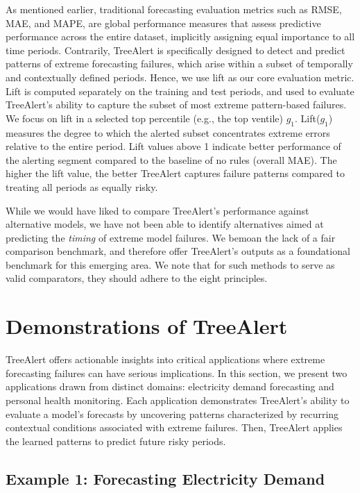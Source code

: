 \documentclass[]{interact}
\theoremstyle{plain}
\theoremstyle{definition}
\theoremstyle{remark}
\begin{document}
As mentioned earlier, traditional forecasting evaluation metrics such as RMSE, MAE, and
MAPE, are global performance measures that assess predictive performance across the entire
dataset, implicitly assigning equal importance to all time periods. Contrarily, TreeAlert is
specifically designed to detect and predict patterns of extreme forecasting failures, which
arise within a subset of temporally and contextually defined periods. Hence, we use lift as
our core evaluation metric. Lift is computed separately on the training and test periods, and
used to evaluate TreeAlert's ability to capture the subset of most extreme pattern-based
failures. We focus on lift in a selected top percentile (e.g., the top ventile) $g_1$.
Lift($g_1$) measures the degree to which the alerted subset concentrates extreme errors
relative to the entire period. Lift values above 1 indicate better performance of the
alerting segment compared to the baseline of no rules (overall MAE). The higher the lift
value, the better TreeAlert captures failure patterns compared to treating all periods as
equally risky.

While we would have liked to compare TreeAlert's performance against alternative models, we
have not been able to identify alternatives aimed at predicting the \emph{timing} of extreme
model failures. We bemoan the lack of a fair comparison benchmark, and therefore offer
TreeAlert's outputs as a foundational benchmark for this emerging area. We note that for
such methods to serve as valid comparators, they should adhere to the eight principles.

\section{Demonstrations of TreeAlert}
\label{sec-demo}

TreeAlert offers actionable insights into critical applications where extreme forecasting
failures can have serious implications. In this section, we present two applications drawn
from distinct domains: electricity demand forecasting and personal health monitoring. Each
application demonstrates TreeAlert's ability to evaluate a model's forecasts by uncovering
patterns characterized by recurring contextual conditions associated with extreme failures.
Then, TreeAlert applies the learned patterns to predict future risky periods.

\subsection{Example 1: Forecasting Electricity Demand}
\end{document}
